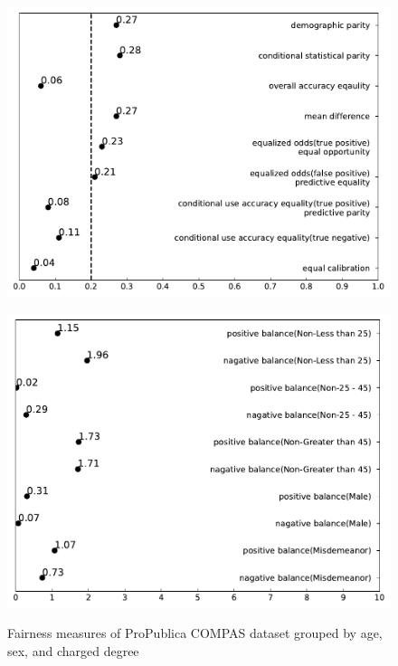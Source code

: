 \documentclass[conference]{IEEEtran}
\begin{document}
\begin{figure}[h]
\begin{minipage}[b]{0.48\linewidth}
        \includegraphics[width=\linewidth]{Non-Greater than 45}
        \label{fig:2}
    \end{minipage}
    \hfill
    \begin{minipage}[b]{0.48\linewidth}
        \centering
        \includegraphics[width=\linewidth]{misc balance}
        \label{fig:2}
    \end{minipage}
    \caption{Fairness measures of ProPublica COMPAS dataset grouped by age, sex, and charged degree}
    \label{fig:compas2}
\end{figure}




\end{document}
